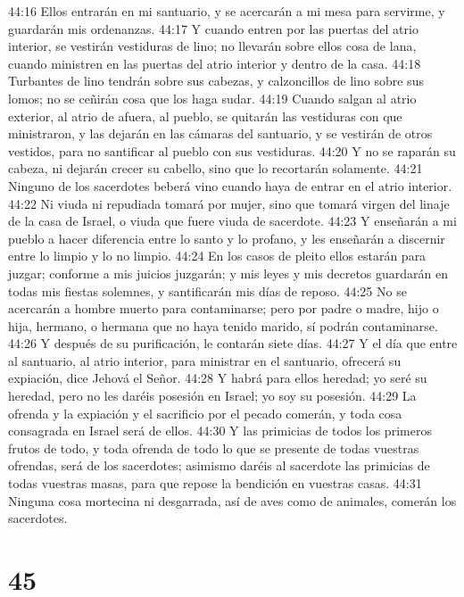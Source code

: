 44:16 Ellos entrarán en mi santuario, y se acercarán a mi mesa para servirme, y guardarán mis ordenanzas.  
44:17 Y cuando entren por las puertas del atrio interior, se vestirán vestiduras de lino; no llevarán sobre ellos cosa de lana, cuando ministren en las puertas del atrio interior y dentro de la casa.  
44:18 Turbantes de lino tendrán sobre sus cabezas, y calzoncillos de lino sobre sus lomos; no se ceñirán cosa que los haga sudar.  
44:19 Cuando salgan al atrio exterior, al atrio de afuera, al pueblo, se quitarán las vestiduras con que ministraron, y las dejarán en las cámaras del santuario, y se vestirán de otros vestidos, para no santificar al pueblo con sus vestiduras.  
44:20 Y no se raparán su cabeza, ni dejarán crecer su cabello, sino que lo recortarán solamente.  
44:21 Ninguno de los sacerdotes beberá vino cuando haya de entrar en el atrio interior. 
44:22 Ni viuda ni repudiada tomará por mujer, sino que tomará virgen del linaje de la casa de Israel, o viuda que fuere viuda de sacerdote. 
44:23 Y enseñarán a mi pueblo a hacer diferencia entre lo santo y lo profano, y les enseñarán a discernir entre lo limpio y lo no limpio. 
44:24 En los casos de pleito ellos estarán para juzgar; conforme a mis juicios juzgarán; y mis leyes y mis decretos guardarán en todas mis fiestas solemnes, y santificarán mis días de reposo.  
44:25 No se acercarán a hombre muerto para contaminarse; pero por padre o madre, hijo o hija, hermano, o hermana que no haya tenido marido, sí podrán contaminarse.  
44:26 Y después de su purificación, le contarán siete días.  
44:27 Y el día que entre al santuario, al atrio interior, para ministrar en el santuario, ofrecerá su expiación, dice Jehová el Señor.  
44:28 Y habrá para ellos heredad; yo seré su heredad, pero no les daréis posesión en Israel; yo soy su posesión.  
44:29 La ofrenda y la expiación y el sacrificio por el pecado comerán, y toda cosa consagrada en Israel será de ellos.  
44:30 Y las primicias de todos los primeros frutos de todo, y toda ofrenda de todo lo que se presente de todas vuestras ofrendas, será de los sacerdotes; asimismo daréis al sacerdote las primicias de todas vuestras masas, para que repose la bendición en vuestras casas. 
44:31 Ninguna cosa mortecina ni desgarrada, así de aves como de animales, comerán los sacerdotes. 

\chapter{45}

